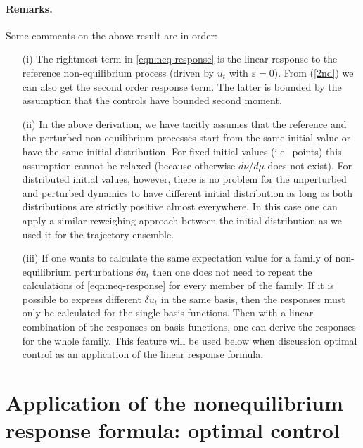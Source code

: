 \documentclass[]{tMPH2e}
\newcommand{\eps}{\varepsilon}
\begin{document}
\paragraph*{Remarks.} Some comments on the above result are in order:
\begin{itemize}

\item[(i)] The rightmost term in \eqref{eqn:neq-response} is the linear 
  response to the reference non-equilibrium process (driven by $u_t$ with $\eps=0$).  From (\ref{2nd}) we can also get the second order response term. The latter is bounded by the assumption that the controls have bounded second moment.  

\item[(ii)] In the above derivation, we have tacitly assumes that the reference and the perturbed non-equilibrium processes start from the same initial value or
  have the same initial distribution. For fixed initial values (i.e.~points) this assumption cannot be relaxed (because otherwise $d\nu/d\mu$ does not exist). For distributed initial values, however, there is no problem for the unperturbed and perturbed dynamics to have different initial distribution as long as both distributions are strictly positive almost everywhere. In this case one can apply a similar reweighing approach between the initial distribution as we used it for the trajectory ensemble.  

\item[(iii)] If one wants to calculate the same expectation value for a family of non-equilibrium perturbations $\delta u_t$ then 
one does not need to repeat the calculations of \eqref{eqn:neq-response} for every member of the family. 
  If it is possible to
  express different $\delta u_t$ in the same basis, then the responses must only be
  calculated for the single basis functions. Then with a linear combination of the responses on basis functions, one can derive
  the responses for the whole family. This feature will be used below when discussion optimal control as an application of the linear response formula. 
  

\end{itemize}





\section{Application of the nonequilibrium response formula: optimal control}
\end{document}
